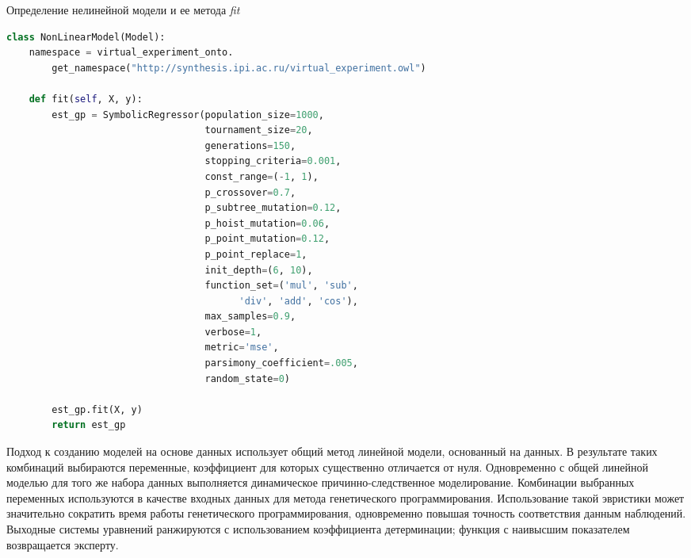 \begin{ListingEnv}[!h]%
    \captiondelim{ } %
    \caption{Определение нелинейной модели и ее метода \textit{fit}}\label{lst:fit}
    \begin{lstlisting}[language={Python}]
class NonLinearModel(Model):
    namespace = virtual_experiment_onto.
        get_namespace("http://synthesis.ipi.ac.ru/virtual_experiment.owl")

    def fit(self, X, y):
        est_gp = SymbolicRegressor(population_size=1000,
                                   tournament_size=20,
                                   generations=150, 
                                   stopping_criteria=0.001,
                                   const_range=(-1, 1),
                                   p_crossover=0.7, 
                                   p_subtree_mutation=0.12,
                                   p_hoist_mutation=0.06, 
                                   p_point_mutation=0.12,
                                   p_point_replace=1,
                                   init_depth=(6, 10),
                                   function_set=('mul', 'sub', 
                                         'div', 'add', 'cos'),
                                   max_samples=0.9,
                                   verbose=1,
                                   metric='mse',
                                   parsimony_coefficient=.005,
                                   random_state=0)

        est_gp.fit(X, y)
        return est_gp
\end{lstlisting}
\end{ListingEnv}

Подход к созданию моделей на основе данных использует общий метод линейной модели, основанный на данных. В результате 
таких комбинаций выбираются переменные, коэффициент для которых существенно отличается от нуля. Одновременно с 
общей линейной моделью для того же набора данных выполняется динамическое причинно-следственное моделирование. 
Комбинации выбранных переменных используются в качестве входных данных для метода генетического программирования. 
Использование такой эвристики может значительно сократить время работы генетического программирования, одновременно 
повышая точность соответствия данным наблюдений. Выходные системы уравнений ранжируются с использованием коэффициента 
детерминации; функция с наивысшим показателем возвращается эксперту.

